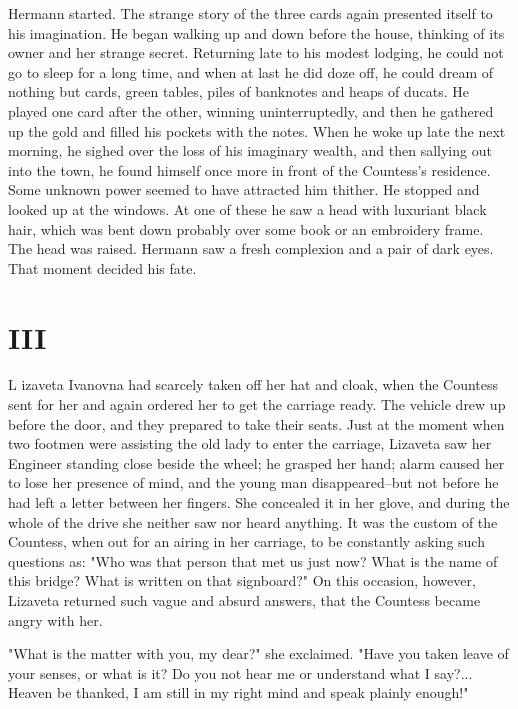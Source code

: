 Hermann started. The strange story of the three cards again presented
itself to his imagination. He began walking up and down before the
house, thinking of its owner and her strange secret. Returning late to
his modest lodging, he could not go to sleep for a long time, and when
at last he did doze off, he could dream of nothing but cards, green
tables, piles of banknotes and heaps of ducats. He played one card
after the other, winning uninterruptedly, and then he gathered up the
gold and filled his pockets with the notes. When he woke up late the
next morning, he sighed over the loss of his imaginary wealth, and
then sallying out into the town, he found himself once more in front
of the Countess's residence. Some unknown power seemed to have
attracted him thither. He stopped and looked up at the windows. At one
of these he saw a head with luxuriant black hair, which was bent down
probably over some book or an embroidery frame. The head was raised.
Hermann saw a fresh complexion and a pair of dark eyes. That moment
decided his fate.



\section{III}

\lettrine[lines=3,lhang=0.11,lraise=0,loversize=0.05]{L}{}%
izaveta Ivanovna had scarcely taken off her hat and cloak, when the
Countess sent for her and again ordered her to get the carriage ready.
The vehicle drew up before the door, and they prepared to take their
seats. Just at the moment when two footmen were assisting the old lady
to enter the carriage, Lizaveta saw her Engineer standing close beside
the wheel; he grasped her hand; alarm caused her to lose her presence
of mind, and the young man disappeared--but not before he had left a
letter between her fingers. She concealed it in her glove, and during
the whole of the drive she neither saw nor heard anything. It was the
custom of the Countess, when out for an airing in her carriage, to be
constantly asking such questions as: "Who was that person that met us
just now? What is the name of this bridge? What is written on that
signboard?" On this occasion, however, Lizaveta returned such vague
and absurd answers, that the Countess became angry with her.

"What is the matter with you, my dear?" she exclaimed. "Have you taken
leave of your senses, or what is it? Do you not hear me or understand
what I say?... Heaven be thanked, I am still in my right mind and
speak plainly enough!"


